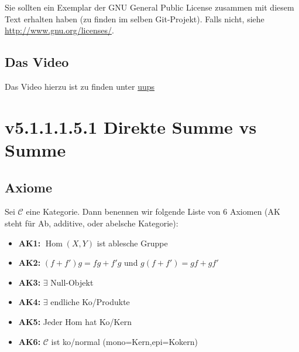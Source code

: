 \documentclass[a4paper]{amsart}
\theoremstyle{definition}
\DeclareMathOperator{\Hom}{Hom}
\newcommand{\CC}{\ensuremath{\mathcal{ C }}}
\begin{document}
Sie sollten ein Exemplar der GNU General Public License zusammen mit diesem Text erhalten haben
(zu finden im selben Git-Projekt).
Falls nicht, siehe \url{http://www.gnu.org/licenses/}.

\subsection*{Das Video}
Das Video hierzu ist zu finden unter
{\tiny
   \url{uups}
}

\section{v5.1.1.1.5.1 Direkte Summe vs Summe}

\subsection{Axiome}
Sei $\CC$ eine Kategorie. Dann benennen wir folgende Liste von 6 Axiomen (AK steht für Ab, additive, oder abelsche Kategorie):
\begin{itemize}
   \item \textbf{AK1:} $\Hom(X,Y)$ ist ablesche Gruppe 
   \item \textbf{AK2:} $(f + f')g = fg + f'g$ und $g(f + f') = gf + gf'$
   \item \textbf{AK3:} $\exists$ Null-Objekt
   \item \textbf{AK4:} $\exists$ endliche Ko/Produkte
   \item \textbf{AK5:} Jeder Hom hat Ko/Kern
   \item \textbf{AK6:} $\CC$ ist ko/normal (mono=Kern,epi=Kokern)
\end{itemize}
\end{document}
